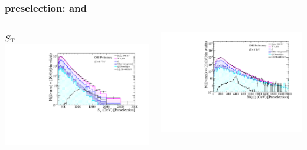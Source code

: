 \documentclass[bigger]{beamer}
\begin{document}
\begin{frame}
\frametitle{\enujj preselection: \ST and \mej}
\label{sec-3-1-2}
\begin{columns}
\begin{column}{0.6\textwidth}
\label{sec-3-1-2-1}

\centering
$S_{\text{T}}$
\includegraphics[width=\textwidth]{fig/enu/preselection_noRatio/sT_PAS_enujj.pdf}
\end{column}
\begin{column}{0.6\textwidth}
\label{sec-3-1-2-2}

\centering
\mej
\includegraphics[width=\textwidth]{fig/enu/preselection_noRatio/Mej_PAS_enujj.pdf}
\end{column}
\end{columns}
\end{frame}
\end{document}

